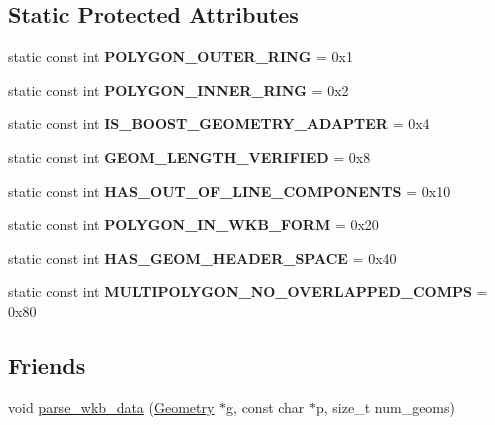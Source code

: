 \subsection*{Static Protected Attributes}
\begin{DoxyCompactItemize}
\item 
\mbox{\label{classGeometry_abd67c02338db6eeb009ffccadd7686cc}} 
static const int {\bfseries P\+O\+L\+Y\+G\+O\+N\+\_\+\+O\+U\+T\+E\+R\+\_\+\+R\+I\+NG} = 0x1
\item 
\mbox{\label{classGeometry_a8403960a98bd97d180802faf400390d3}} 
static const int {\bfseries P\+O\+L\+Y\+G\+O\+N\+\_\+\+I\+N\+N\+E\+R\+\_\+\+R\+I\+NG} = 0x2
\item 
\mbox{\label{classGeometry_afe90150ddec46062f36d19853296b2fb}} 
static const int {\bfseries I\+S\+\_\+\+B\+O\+O\+S\+T\+\_\+\+G\+E\+O\+M\+E\+T\+R\+Y\+\_\+\+A\+D\+A\+P\+T\+ER} = 0x4
\item 
\mbox{\label{classGeometry_a7a8d24aae90613b6d1529d752de1723b}} 
static const int {\bfseries G\+E\+O\+M\+\_\+\+L\+E\+N\+G\+T\+H\+\_\+\+V\+E\+R\+I\+F\+I\+ED} = 0x8
\item 
\mbox{\label{classGeometry_ad53e5b70eab9332b73d1890fa93b7960}} 
static const int {\bfseries H\+A\+S\+\_\+\+O\+U\+T\+\_\+\+O\+F\+\_\+\+L\+I\+N\+E\+\_\+\+C\+O\+M\+P\+O\+N\+E\+N\+TS} = 0x10
\item 
\mbox{\label{classGeometry_af4287cc1537ddd8e858b07c03a0f919a}} 
static const int {\bfseries P\+O\+L\+Y\+G\+O\+N\+\_\+\+I\+N\+\_\+\+W\+K\+B\+\_\+\+F\+O\+RM} = 0x20
\item 
\mbox{\label{classGeometry_a9c4dbe8fb8b74fec23285d4f0e2b7b50}} 
static const int {\bfseries H\+A\+S\+\_\+\+G\+E\+O\+M\+\_\+\+H\+E\+A\+D\+E\+R\+\_\+\+S\+P\+A\+CE} = 0x40
\item 
\mbox{\label{classGeometry_a6159db662288580d06dac124531fc7da}} 
static const int {\bfseries M\+U\+L\+T\+I\+P\+O\+L\+Y\+G\+O\+N\+\_\+\+N\+O\+\_\+\+O\+V\+E\+R\+L\+A\+P\+P\+E\+D\+\_\+\+C\+O\+M\+PS} = 0x80
\end{DoxyCompactItemize}
\subsection*{Friends}
\begin{DoxyCompactItemize}
\item 
void \mbox{\hyperlink{classGeometry_af4cc4635baabc8496089c8359f5a305f}{parse\+\_\+wkb\+\_\+data}} (\mbox{\hyperlink{classGeometry}{Geometry}} $\ast$g, const char $\ast$p, size\+\_\+t num\+\_\+geoms)
\end{DoxyCompactItemize}


